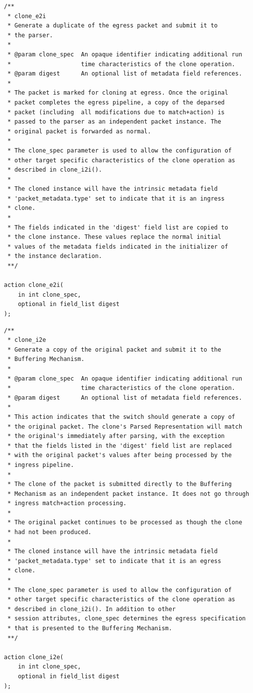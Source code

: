 \documentclass[12pt]{article}
\begin{document}
\begin{lstlisting}[style=P4style]
/**
 * clone_e2i
 * Generate a duplicate of the egress packet and submit it to
 * the parser.
 *
 * @param clone_spec  An opaque identifier indicating additional run
 *                    time characteristics of the clone operation.
 * @param digest      An optional list of metadata field references.
 *
 * The packet is marked for cloning at egress. Once the original
 * packet completes the egress pipeline, a copy of the deparsed
 * packet (including  all modifications due to match+action) is
 * passed to the parser as an independent packet instance. The
 * original packet is forwarded as normal.
 * 
 * The clone_spec parameter is used to allow the configuration of
 * other target specific characteristics of the clone operation as
 * described in clone_i2i(). 
 * 
 * The cloned instance will have the intrinsic metadata field
 * 'packet_metadata.type' set to indicate that it is an ingress
 * clone. 
 * 
 * The fields indicated in the 'digest' field list are copied to
 * the clone instance. These values replace the normal initial
 * values of the metadata fields indicated in the initializer of
 * the instance declaration. 
 **/

action clone_e2i(
    in int clone_spec,
    optional in field_list digest
);

\end{lstlisting}


\begin{lstlisting}[style=P4style]
/**
 * clone_i2e
 * Generate a copy of the original packet and submit it to the
 * Buffering Mechanism.
 *
 * @param clone_spec  An opaque identifier indicating additional run
 *                    time characteristics of the clone operation.
 * @param digest      An optional list of metadata field references.
 *
 * This action indicates that the switch should generate a copy of
 * the original packet. The clone's Parsed Representation will match
 * the original's immediately after parsing, with the exception
 * that the fields listed in the 'digest' field list are replaced
 * with the original packet's values after being processed by the 
 * ingress pipeline.
 * 
 * The clone of the packet is submitted directly to the Buffering
 * Mechanism as an independent packet instance. It does not go through
 * ingress match+action processing.
 * 
 * The original packet continues to be processed as though the clone
 * had not been produced.
 * 
 * The cloned instance will have the intrinsic metadata field
 * 'packet_metadata.type' set to indicate that it is an egress
 * clone. 
 * 
 * The clone_spec parameter is used to allow the configuration of
 * other target specific characteristics of the clone operation as
 * described in clone_i2i(). In addition to other
 * session attributes, clone_spec determines the egress specification
 * that is presented to the Buffering Mechanism.
 **/

action clone_i2e(
    in int clone_spec,
    optional in field_list digest
);

\end{lstlisting}
\end{document}
